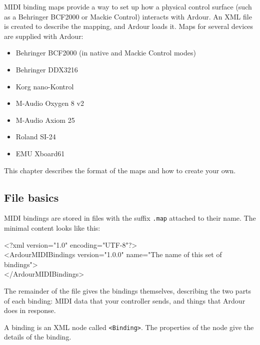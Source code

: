 \documentclass[10pt,a4paper]{book}
\begin{document}
{MIDI binding maps provide a way to set up how a physical control
surface (such as a Behringer BCF2000 or Mackie Control) interacts with
Ardour.  An XML file is created to describe the mapping, and Ardour
loads it.  Maps for several devices are supplied with Ardour:

\begin{itemize}
\item Behringer BCF2000 (in native and Mackie Control modes)
\item Behringer DDX3216
\item Korg nano-Kontrol
\item M-Audio Oxygen 8 v2
\item M-Audio Axiom 25
\item Roland SI-24
\item EMU Xboard61
\end{itemize}

This chapter describes the format of the maps and how to create your own.


\subsection{File basics}

MIDI bindings are stored in files with the suffix \texttt{.map}
attached to their name. The minimal content looks like this:

\begin{listing}
<?xml version="1.0" encoding="UTF-8"?>\\
<ArdourMIDIBindings version="1.0.0" name="The name of this set of bindings">\\
</ArdourMIDIBindings>\\
\end{listing}

The remainder of the file gives the bindings themselves, describing
the two parts of each binding: MIDI data that your controller sends,
and things that Ardour does in response.

A binding is an XML node called \texttt{<Binding>}.  The properties of the
node give the details of the binding.  



}
\end{document}
